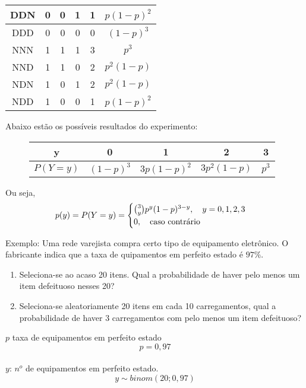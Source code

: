 \begin{description}
\begin{tabular}{c c c c c c }
       DDN& 0 & 0 & 1 & 1 & $p(1-p)^2$\\\midrule

       DDD&  0 & 0 & 0 & 0 & $(1-p)^3$\\\midrule

       NNN&   1 & 1 & 1 & 3 & $p^3$\\\midrule

       NND& 1 & 1 & 0 & 2 & $p^2(1-p)$\\\midrule

       NDN& 1 & 0 & 1 & 2 & $p^2(1-p)$\\\midrule

       NDD& 1 & 0 & 0 & 1 & $p(1-p)^2$ \\ \bottomrule

     \end{tabular}

     Abaixo estão os possíveis resultados do experimento:


     \begin{figure} 
       \centering
       \begin{tabular}{c c c c c}
         \toprule
         y&0&1&2&3\\ \midrule
         $P(Y=y)$&$(1-p)^3$&$3p(1-p)^2$&$3p^2(1-p)$&$p^3$\\ \bottomrule
       \end{tabular}
       \label{fig:127}
     \end{figure}
      Ou seja,
      \begin{align*}
        p(y)=P(Y=y)=\begin{cases}
          \binom{3}{y}p^y (1-p)^{3-y}, \text{\quad}y=0,1,2,3\\
          0, \text{\quad caso contrário}
        \end{cases}
      \end{align*}
    \item{Exemplo}: Uma rede varejista compra certo tipo de equipamento eletrônico. O 
      fabricante indica que a taxa de quipamentos em perfeito estado é $97\%$.
      \begin{enumerate}[label=(\alph*)]
        \item Seleciona-se ao acaso 20 itens. Qual a probabilidade de haver pelo menos 
          um item defeituoso nesses 20?
        \item Seleciona-se aleatoriamente 20 itens em cada 10 carregamentos, qual a 
          probabilidade de haver 3 carregamentos com pelo menos um item defeituoso?
      \end{enumerate}
      $p$ taxa de equipamentos em perfeito estado\\
      $$p=0,97$$\\
      $y$: $n^o$ de equipamentos em perfeito estado.\\
      $$y \sim binom(20;0,97)$$\\


\end{description}
